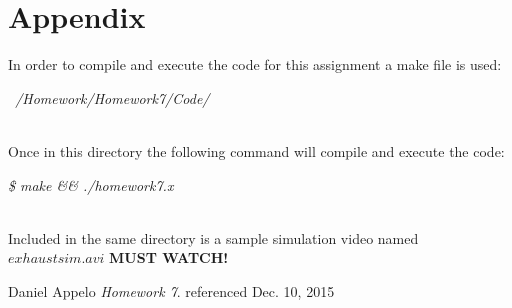 \documentclass{article}
\begin{document}

\newpage
\section{Appendix}
\indent In order to compile and execute the code for this assignment a make file is used:
\\
\begin{center}
\textit{~/Homework/Homework7/Code/}
\end{center}
\\
Once in this directory the following command will compile and execute the code:
\\
\begin{center}
\textit{\$ make \&\& ./homework7.x}
\end{center}
\\
Included in the same directory is a sample simulation video named \(exhaustsim.avi\)
\textbf{MUST WATCH!}
\newpage
\begin{thebibliography}{9}
Daniel Appelo
\textit{Homework 7}. 
referenced Dec. 10, 2015

\end{thebibliography}

\end{document}

